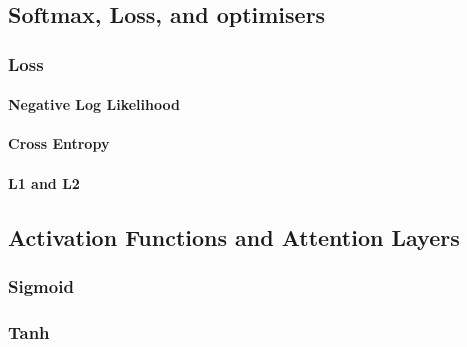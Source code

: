 %
%
\subsection{Softmax, Loss, and optimisers}

\subsubsection{Loss}

\paragraph{Negative Log Likelihood}

\paragraph{Cross Entropy}

\paragraph{L1 and L2}

\subsection{Activation Functions and Attention Layers}

\subsubsection{Sigmoid}

\subsubsection{Tanh}

